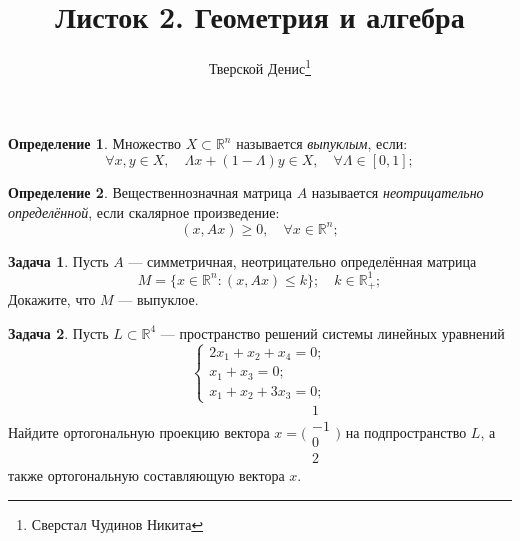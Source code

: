 \documentclass[a4paper,12pt]{article}
\theoremstyle{definition}
\newtheorem{definition}{Определение}
\newtheorem{problem}{Задача}
\begin{document}
\date{}
\author{Тверской Денис\thanks{Сверстал Чудинов Никита}}
\title{Листок 2. Геометрия и алгебра}
\frenchspacing

\maketitle

\begin{definition}
Множество $X\subset\mathbb{R}^n$ называется \emph{выпуклым}, если:
\begin{equation*}
\forall x,y \in X, \quad \Lambda x+(1-\Lambda)y \in X, \quad \forall \Lambda \in [0, 1];
\end{equation*}
\end{definition}

\begin{definition}
Вещественнозначная матрица $A$ называется \emph{неотрицательно определённой}, если скалярное произведение:
\begin{equation*}
	(x, Ax) \geq 0, \quad \forall x \in \mathbb{R}^n;
\end{equation*}
\end{definition}

\begin{problem}
Пусть $A$ --- симметричная, неотрицательно определённая матрица
\begin{equation*}
	M = \{x \in \mathbb{R}^n: (x, Ax) \leq k \}; \quad k \in \mathbb{R}^1_+;
\end{equation*}
Докажите, что $M$ --- выпуклое.
\end{problem}

\begin{problem}
Пусть $L \subset \mathbb{R}^4$ --- пространство решений системы линейных уравнений
\begin{equation*}
	\begin{cases}
		2x_1 + x_2 + x_4 = 0; \\
		x_1 + x_3 = 0; \\
		x_1 + x_2 + 3x_3 = 0;
	\end{cases}
\end{equation*}
Найдите ортогональную проекцию вектора $x = %
\biggl(\begin{smallmatrix}
	1 \\
	-1 \\
	0 \\
	2
\end{smallmatrix}\biggr)$ на подпространство $L$, а также ортогональную составляющую вектора $x$.
\end{problem}
\end{document}
